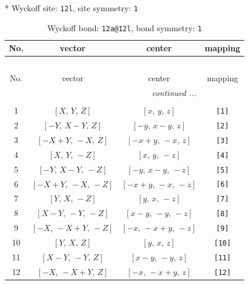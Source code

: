 \documentclass[fleqn,8pt]{jsarticle}
\begin{document}
* Wyckoff site: {\tt 12l}, site symmetry: {\tt 1}
\renewcommand{\arraystretch}{1.2}
\begin{longtable}{cccc}
\caption{Wyckoff bond: {\tt 12a@12l}, bond symmetry: {\tt 1}}
 \\
 \hline \hline
No. & vector & center & mapping \\ \hline \endfirsthead

\multicolumn{3}{l}{\tablename\ \thetable{}} \\
 \hline \hline
No. & vector & center & mapping \\ \hline \endhead

 \hline \hline
\multicolumn{3}{r}{\footnotesize\it continued ...} \\ \endfoot

 \hline \hline
\multicolumn{3}{r}{} \\ \endlastfoot

1 & $\left[ X,\, Y,\, Z \right]$ & $\left[ x,\, y,\, z \right]$ & {\tt [1]} \\ \hline
2 & $\left[ - Y,\, X - Y,\, Z \right]$ & $\left[ - y,\, x - y,\, z \right]$ & {\tt [2]} \\ \hline
3 & $\left[ - X + Y,\, - X,\, Z \right]$ & $\left[ - x + y,\, - x,\, z \right]$ & {\tt [3]} \\ \hline
4 & $\left[ X,\, Y,\, - Z \right]$ & $\left[ x,\, y,\, - z \right]$ & {\tt [4]} \\ \hline
5 & $\left[ - Y,\, X - Y,\, - Z \right]$ & $\left[ - y,\, x - y,\, - z \right]$ & {\tt [5]} \\ \hline
6 & $\left[ - X + Y,\, - X,\, - Z \right]$ & $\left[ - x + y,\, - x,\, - z \right]$ & {\tt [6]} \\ \hline
7 & $\left[ Y,\, X,\, - Z \right]$ & $\left[ y,\, x,\, - z \right]$ & {\tt [7]} \\ \hline
8 & $\left[ X - Y,\, - Y,\, - Z \right]$ & $\left[ x - y,\, - y,\, - z \right]$ & {\tt [8]} \\ \hline
9 & $\left[ - X,\, - X + Y,\, - Z \right]$ & $\left[ - x,\, - x + y,\, - z \right]$ & {\tt [9]} \\ \hline
10 & $\left[ Y,\, X,\, Z \right]$ & $\left[ y,\, x,\, z \right]$ & {\tt [10]} \\ \hline
11 & $\left[ X - Y,\, - Y,\, Z \right]$ & $\left[ x - y,\, - y,\, z \right]$ & {\tt [11]} \\ \hline
12 & $\left[ - X,\, - X + Y,\, Z \right]$ & $\left[ - x,\, - x + y,\, z \right]$ & {\tt [12]} \\
\end{longtable}
\end{document}

